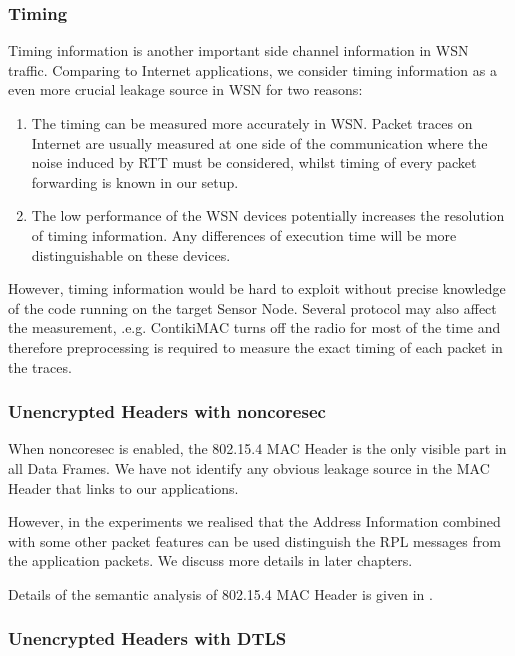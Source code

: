 \subsubsection{Timing}

Timing information is another important side channel information in WSN traffic. Comparing to Internet applications, we consider timing information as a even more crucial leakage source in WSN for two reasons:

\begin{enumerate}
	\item The timing can be measured more accurately in WSN. Packet traces on Internet are usually measured at one side of the communication where the noise induced by RTT must be considered, whilst timing of every packet forwarding is known in our setup.
	\item The low performance of the WSN devices potentially increases the resolution of timing information. Any differences of execution time will be more distinguishable on these devices.
\end{enumerate}

However, timing information would be hard to exploit without precise knowledge of the code running on the target Sensor Node. Several protocol may also affect the measurement, .e.g. ContikiMAC turns off the radio for most of the time and therefore preprocessing is required to measure the exact timing of each packet in the traces.

\subsubsection{Unencrypted Headers with noncoresec}

When noncoresec is enabled, the 802.15.4 MAC Header is the only visible part in all Data Frames. We have not identify any obvious leakage source in the MAC Header that links to our applications. 

However, in the experiments we realised that the Address Information combined with some other packet features can be used distinguish the RPL messages from the application packets. We discuss more details in later chapters.

Details of the semantic analysis of 802.15.4 MAC Header is given in . 

\subsubsection{Unencrypted Headers with DTLS}

